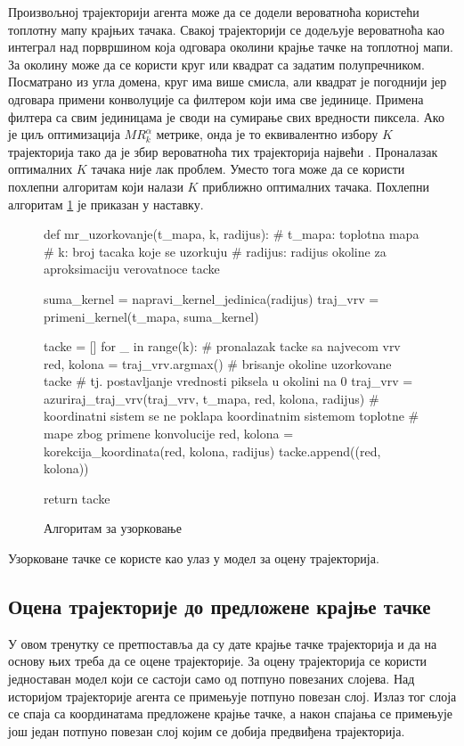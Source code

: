 \documentclass[11pt,oneside]{memoir}
\begin{document}
Произвољној трајекторији агента може да се додели вероватноћа користећи топлотну мапу крајњих тачака. Свакој трајекторији се додељује вероватноћа
као интеграл над порвршином која одговара околини крајње тачке на топлотној мапи. За околину може да се користи круг или квадрат са задатим 
полупречником. Посматрано из угла домена, круг има више смисла, али квадрат је погоднији јер одговара примени конволуције са филтером који има све јединице.
Примена филтера са свим јединицама је своди на сумирање свих вредности пиксела.
Ако је циљ оптимизација $MR^{\alpha}_{k}$ метрике, онда је то еквивалентно избору $K$ трајекторија тако да је збир вероватноћа 
тих трајекторија највећи \cite{home}. 
Проналазак оптималних $K$ тачака није лак проблем. Уместо тога може да се користи похлепни алгоритам који налази $K$ приближно оптималних
тачака. Похлепни алгоритам \ref{home-sampling-mr} је приказан у наставку.

\begin{figure}[H]
  \begin{python}
  def mr_uzorkovanje(t_mapa, k, radijus):
    # t_mapa: toplotna mapa
    # k: broj tacaka koje se uzorkuju
    # radijus: radijus okoline za aproksimaciju verovatnoce tacke

    suma_kernel = napravi_kernel_jedinica(radijus)
    traj_vrv = primeni_kernel(t_mapa, suma_kernel)
    
    tacke = []
    for _ in range(k):
      # pronalazak tacke sa najvecom vrv
      red, kolona = traj_vrv.argmax()  
      # brisanje okoline uzorkovane tacke
      # tj. postavljanje vrednosti piksela u okolini na 0
      traj_vrv = azuriraj_traj_vrv(traj_vrv, t_mapa, red, kolona, radijus)
      # koordinatni sistem se ne poklapa koordinatnim sistemom toplotne 
      # mape zbog primene konvolucije
      red, kolona = korekcija_koordinata(red, kolona, radijus)
      tacke.append((red, kolona))

    return tacke
  \end{python}
  \caption{Алгоритам за узорковање\label{home-sampling-mr}}
\end{figure}

Узорковане тачке се користе као улаз у модел за оцену трајекторија.
  
\subsection{Оцена трајекторије до предложене крајње тачке}

У овом тренутку се претпоставља да су дате крајње тачке трајекторија и да на основу њих треба да се оцене трајекторије. За оцену
трајекторија се користи једноставан модел који се састоји само од потпуно повезаних слојева. Над историјом трајекторије агента се
примењује потпуно повезан слој. Излаз тог слоја се спаја са координатама предложене крајње тачке, а након спајања се примењује још један
потпуно повезан слој којим се добија предвиђена трајекторија.
\end{document}
